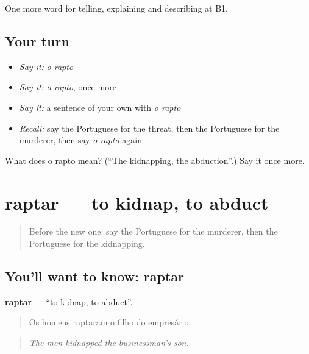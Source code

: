 \begin{grammarlens}[title={What you've built}]
One more word for telling, explaining and describing at B1.
\end{grammarlens}

\subsection*{Your turn}
\begin{itemize}
\raggedright
  \item \emph{Say it:} \emph{o rapto}
  \item \emph{Say it:} \emph{o rapto}, once more
  \item \emph{Say it:} a sentence of your own with \emph{o rapto}
  \item \emph{Recall:} say the Portuguese for the threat, then the Portuguese for the murderer, then say \emph{o rapto} again
\end{itemize}

\begin{tcolorbox}[breakable,colback=teal!4,colframe=teal!35!black,title={Before you move on}]
What does o rapto mean? (\textquotedblleft{}The kidnapping, the abduction\textquotedblright{}.) Say it once more.
\end{tcolorbox}
\section[raptar]{raptar — to kidnap, to abduct}

\label{lesson:PT-C291-raptar}



\begin{quote}
Before the new one: say the Portuguese for the murderer, then the Portuguese for the kidnapping.
\end{quote}

\subsection*{You'll want to know: raptar}
\textbf{raptar} — \textquotedblleft{}to kidnap, to abduct\textquotedblright{}.

\begin{quote}
Os homens raptaram o filho do empresário.
\end{quote}

\begin{quote}
\emph{The men kidnapped the businessman’s son.}
\end{quote}


